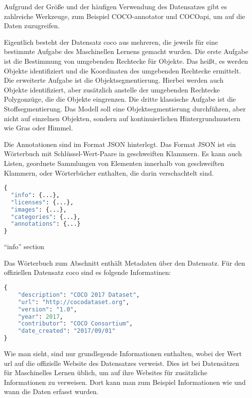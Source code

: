 Aufgrund der Größe und der häufigen Verwendung des Datensatzes gibt es zahlreiche Werkzeuge, zum Beispiel COCO-annotator und COCOapi, um auf die Daten zuzugreifen.


Eigentlich besteht der Datensatz \ac{coco} aus mehreren, die jeweils für eine bestimmte Aufgabe des Maschinellen Lernens gemacht wurden. Die erste Aufgabe ist die Bestimmung von umgebenden Rechtecke für Objekte. Das heißt, es werden Objekte identifiziert und die Koordinaten des umgebenden Rechtecke ermittelt. Die erweiterte Aufgabe ist die Objektsegmentierung. Hierbei werden auch Objekte identifiziert, aber zusätzlich anstelle der umgebenden Rechtecke Polygonzüge, die die Objekte eingrenzen. Die dritte klassische Aufgabe ist die Stoffsegmentierung. Das Modell soll eine Objektsegmentierung durchführen, aber nicht auf einzelnen Objekten, sondern auf kontinuierlichen Hintergrundmustern wie Gras oder Himmel.


\bigskip

Die Annotationen sind im Format JSON hinterlegt. Das Format JSON ist ein Wörterbuch mit Schlüssel-Wert-Paare in geschweiften Klammern. Es kann auch Listen, geordnete Sammlungen von Elementen innerhalb von geschweiften Klammern, oder Wörterbücher enthalten, die darin verschachtelt sind.

\begin{code}
\begin{lstlisting}[language=python]
{
  "info": {...},
  "licenses": {...},
  "images": {...},
  "categories": {...},
  "annotations": {...}
}    
\end{lstlisting}
\caption{Informationen des Datensatzes \ac{coco}}
\end{code}



“info” section

Das Wörterbuch zum Abschnitt  enthält Metadaten über den Datensatz. Für den offiziellen Datensatz \ac{coco} sind es folgende Informatinen:


\begin{code}
\begin{lstlisting}[language=python]
{
    "description": "COCO 2017 Dataset",
    "url": "http://cocodataset.org",
    "version": "1.0",
    "year": 2017,
    "contributor": "COCO Consortium",
    "date_created": "2017/09/01"
}
\end{lstlisting}
\caption{Metainformationen des Datensatzes \ac{coco}}
\end{code}

Wie man sieht, sind nur grundlegende Informationen enthalten, wobei der Wert url auf die offizielle Website des Datensatzes verweist. Dies ist bei Datensätzen für Maschinelles Lernen üblich, um auf ihre Websites für zusätzliche Informationen zu verweisen. Dort kann man zum Beispiel Informationen wie und wann die Daten erfasst wurden.

